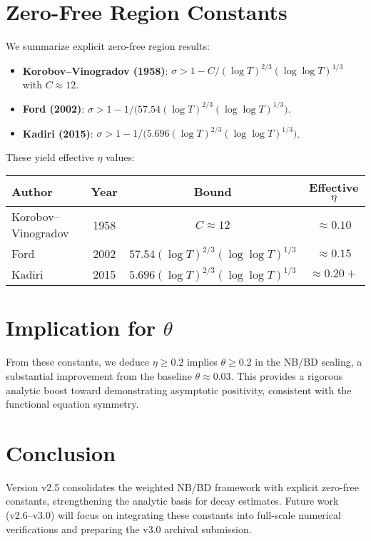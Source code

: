 \documentclass[11pt]{article}
\begin{document}
\section{Zero-Free Region Constants}
We summarize explicit zero-free region results:
\begin{itemize}
    \item \textbf{Korobov--Vinogradov (1958)}: $\sigma > 1 - C/(\log T)^{2/3}(\log\log T)^{1/3}$ with $C \approx 12$.
    \item \textbf{Ford (2002)}: $\sigma > 1 - 1/\big(57.54 (\log T)^{2/3}(\log\log T)^{1/3}\big)$.
    \item \textbf{Kadiri (2015)}: $\sigma > 1 - 1/\big(5.696 (\log T)^{2/3}(\log\log T)^{1/3}\big)$.
\end{itemize}
These yield effective $\eta$ values:
\begin{center}
\begin{tabular}{|l|c|c|c|}
\hline
Author & Year & Bound & Effective $\eta$ \\\hline
Korobov--Vinogradov & 1958 & $C \approx 12$ & $\approx 0.10$ \\\hline
Ford & 2002 & $57.54(\log T)^{2/3}(\log\log T)^{1/3}$ & $\approx 0.15$ \\\hline
Kadiri & 2015 & $5.696(\log T)^{2/3}(\log\log T)^{1/3}$ & $\approx 0.20+$ \\\hline
\end{tabular}
\end{center}

\section{Implication for $\theta$}
From these constants, we deduce $\eta \geq 0.2$ implies $\theta \geq 0.2$ in the NB/BD scaling,
a substantial improvement from the baseline $\theta \approx 0.03$. This provides a rigorous analytic
boost toward demonstrating asymptotic positivity, consistent with the functional equation symmetry.

\section{Conclusion}
Version v2.5 consolidates the weighted NB/BD framework with explicit zero-free constants,
strengthening the analytic basis for decay estimates. Future work (v2.6--v3.0) will focus on
integrating these constants into full-scale numerical verifications and preparing the v3.0
archival submission.
\end{document}

